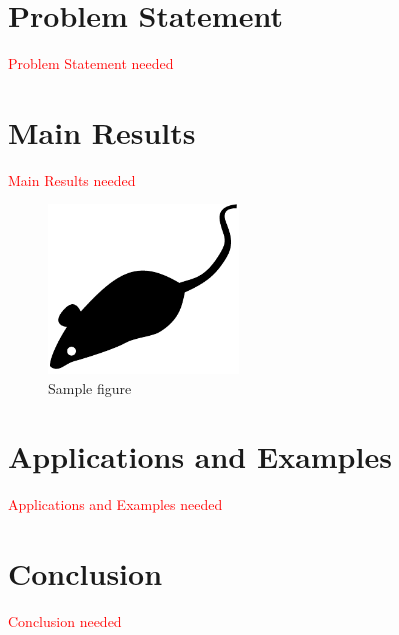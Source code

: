 \documentclass{acm_proc_article-sp}
\providecommand{\note}{\textcolor{red}} %
\begin{document}
\section{Problem Statement} \label{sec:problemStatement}
\note{Problem Statement needed}

\section{Main Results} \label{sec:mainResults}
\note{Main Results needed} 

\begin{figure}[t]
  \begin{center}
    \includegraphics[width=0.45\textwidth]{sampleFig}
    \caption{Sample figure}
    \label{fig:sampleFig}
  \end{center}
\end{figure}

\section{Applications and Examples} \label{sec:applicationsAndExamples}
\note{Applications and Examples needed}

\section{Conclusion} \label{sec:conclusionAndFutureWork}
\note{Conclusion needed}
\end{document}
